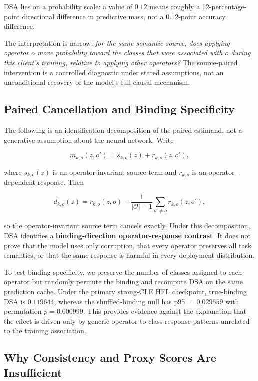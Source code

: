 DSA lies on a probability scale: a value of \(0.12\) means roughly a 12-percentage-point directional difference in predictive mass, not a \(0.12\)-point accuracy difference.

The interpretation is narrow: \emph{for the same semantic source, does applying operator \(o\) move probability toward the classes that were associated with \(o\) during this client's training, relative to applying other operators?} The source-paired intervention is a controlled diagnostic under stated assumptions, not an unconditional recovery of the model's full causal mechanism.

\subsection{Paired Cancellation and Binding Specificity}

The following is an identification decomposition of the paired estimand, not a generative assumption about the neural network. Write

\[
m_{k,o}(z,o')=s_{k,o}(z)+r_{k,o}(z,o'),
\]

where \(s_{k,o}(z)\) is an operator-invariant source term and \(r_{k,o}\) is an operator-dependent response. Then

\[
d_{k,o}(z)=r_{k,o}(z,o)
-\frac{1}{|\mathcal O|-1}\sum_{o'\neq o}r_{k,o}(z,o'),
\]

so the operator-invariant source term cancels exactly. Under this decomposition, DSA identifies a \textbf{binding-direction operator-response contrast}. It does not prove that the model uses only corruption, that every operator preserves all task semantics, or that the same response is harmful in every deployment distribution.

To test binding specificity, we preserve the number of classes assigned to each operator but randomly permute the binding and recompute DSA on the same prediction cache. Under the primary strong-CLE HFL checkpoint, true-binding DSA is \(0.119644\), whereas the shuffled-binding null has p95 \(=0.029559\) with permutation \(p=0.000999\). This provides evidence against the explanation that the effect is driven only by generic operator-to-class response patterns unrelated to the training association.

\subsection{Why Consistency and Proxy Scores Are Insufficient}

